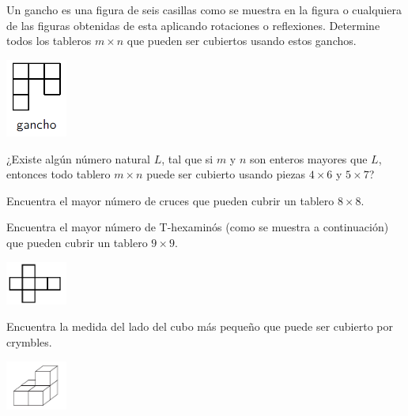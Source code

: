 \documentclass[11pt]{scrartcl}
\begin{document}
\begin{problem}[IMO 2004] Un gancho es una figura de seis casillas como se muestra en la figura o cualquiera de las figuras obtenidas de esta aplicando rotaciones o reflexiones. Determine todos los tableros $m \times n$ que pueden ser cubiertos usando estos ganchos.
\begin{center}
    \includegraphics[width=2cm]{images/clase_09_gancho.png}
\end{center}
\end{problem}

\begin{problem}[Putnam 1991] ¿Existe algún número natural $L$, tal que si $m$ y $n$ son enteros mayores que $L$, entonces todo tablero $m \times n$ puede ser cubierto usando piezas $4 \times 6$ y $5 \times 7$?
\end{problem}

\begin{problem}[Bielorrusia 2000] Encuentra el mayor número de cruces que pueden cubrir un tablero $8 \times 8$.
\end{problem}

\begin{problem}[Bielorrusia 2000] Encuentra el mayor número de T-hexaminós (como se muestra a continuación) que pueden cubrir un tablero $9 \times 9$.
\begin{center}
    \includegraphics[width=2cm]{images/clase_09_hexamino.png}
\end{center}
\end{problem}

\begin{problem}[Estonia 2004] Encuentra la medida del lado del cubo más pequeño que puede ser cubierto por crymbles.
\begin{center}
    \includegraphics[width=2cm]{images/clase_09_crymble.png}
\end{center}
\end{problem}
\end{document}
